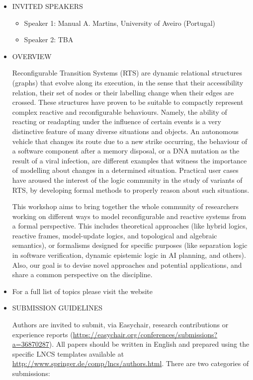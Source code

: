 \documentclass[prodmode,acmtecs]{acmsmall} %
\begin{document}
\begin{itemize}\item  INVITED SPEAKERS 
 
\begin{itemize}\item  Speaker 1: Manual A. Martins, University of Aveiro (Portugal)
\item  Speaker 2: TBA
\end{itemize} 
\item  OVERVIEW 
 
  Reconfigurable Transition Systems (RTS) are dynamic relational structures (graphs) that evolve along its execution, in the sense that their accessibility relation, their set of nodes or their labelling change when their edges are crossed. These structures have proven to be suitable to compactly represent complex reactive and reconfigurable behaviours. Namely, the ability of reacting or readapting under the influence of certain events is a very distinctive feature of many diverse situations and objects. An autonomous vehicle that changes its route due to a new strike occurring, the behaviour of a software component after a memory disposal, or a DNA mutation as the result of a viral infection, are different examples that witness the importance of modelling about changes in a determined situation. Practical user cases have aroused the interest of the logic community in the study of variants of RTS, by developing formal methods to properly reason about such situations. 
 
  This workshop aims to bring together the whole community of researchers working on different ways to model reconfigurable and reactive systems from a formal perspective. This includes theoretical approaches (like hybrid logics, reactive frames, model-update logics, and topological and algebraic semantics), or formalisms designed for specific purposes (like separation logic in software verification, dynamic epistemic logic in AI planning, and others). Also, our goal is to devise novel approaches and potential applications, and share a common perspective on the discipline. 
 
\item  For a full list of topics please visit the website 
 
\item  SUBMISSION GUIDELINES 
 
  Authors are invited to submit, via Easychair, research contributions or experience reports (\href{https://easychair.org/conferences/submissions?a=36870287}{https://easychair.org/conferences/submissions?a=36870287}). All papers should be written in English and prepared using the specific LNCS templates available at \href{http://www.springer.de/comp/lncs/authors.html}{http://www.springer.de/comp/lncs/authors.html}. There are two categories of submissions: 
 

\end{itemize}
\end{document}
